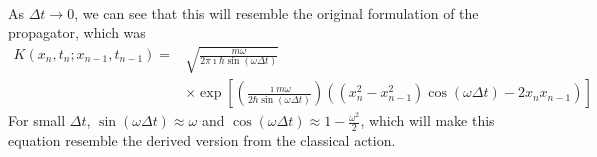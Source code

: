 \documentclass[a4paper,twoside]{article}
\begin{document}
\begin{itemize}
\begin{problem}
\begin{align}
            \end{align}
            As $ \Delta t \to 0 $, we can see that this will resemble the original formulation of the propagator, which was
            \begin{align}
                K(x_n, t_n ; x_{n-1}, t_{n-1}) = &\sqrt{\frac{m \omega}{2 \pi \imath \hbar \sin(\omega \Delta t)}}\\
                & \times \exp\left[ \left( \frac{\imath m \omega}{2 \hbar \sin(\omega \Delta t)} \right) \left( (x_n^2 - x_{n-1}^2) \cos(\omega \Delta t) - 2 x_{n} x_{n-1} \right) \right]
            \end{align}
            For small $ \Delta t $, $ \sin(\omega \Delta t) \approx \omega $ and $ \cos(\omega \Delta t) \approx 1 - \frac{\omega^2}{2} $, which will make this equation resemble the derived version from the classical action. 
        \end{problem}
\end{itemize}
\end{document}
